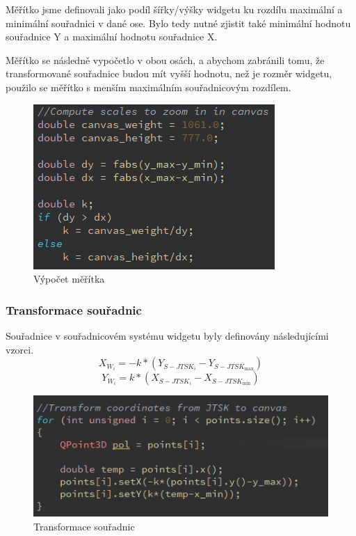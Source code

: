 \documentclass[11pt]{article}
\begin{document}
Měřítko jsme definovali jako podíl šířky/výšky widgetu ku rozdílu maximální a minimální souřadnici v dané ose. Bylo tedy nutné zjistit také minimální hodnotu souřadnice Y a maximální hodnotu souřadnice X.
	

Měřítko se následně vypočetlo v obou osách, a abychom zabránili tomu, že transformované souřadnice budou mít vyšší hodnotu, než je rozměr widgetu, použilo se měřítko s menším maximálním souřadnicovým rozdílem.
	
\begin{figure}[htbh]
	\centering
	\includegraphics[scale=0.8]{images/U2_problem_meritko2.png} 
	\caption{Výpočet měřítka}
	\label{fig:problem_scale2}
\end{figure} 
	
\subsubsection{Transformace souřadnic}
Souřadnice v souřadnicovém systému widgetu byly definovány následujícími vzorci.	
	$$X_{W_{i}}=-k *\left(Y_{S-J T S K_{i}}-Y_{S-J T S K_{\max }}\right)$$	
	$$ Y_{W_{i}}=k *\left(X_{S-J T S K_{i}}-X_{S-J T S K_{\min }}\right)$$
	
\begin{figure}[htbh]
	\centering
	\includegraphics[scale=1]{images/U2_problem_transformace.png} 
	\caption{Transformace souřadnic}
	\label{fig:problem_transformation}
\end{figure} 
\end{document}
